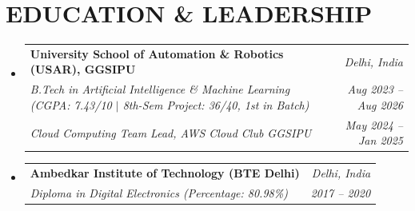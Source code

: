 \documentclass[10pt,a4paper]{article}
\makeatletter
\newcommand{\resumeSubheading}[4]{
  \vspace{-1pt}\item
    \begin{tabular*}{0.99\textwidth}[t]{@{}l@{\extracolsep{\fill}}r@{}}
      \textbf{#1} & \textit{\small #2} \\
      \textit{\small #3} & \textit{\small #4} \\
    \end{tabular*}\vspace{-5pt}
}
\newcommand{\resumeDualSubheading}[6]{
  \vspace{-1pt}\item
    \begin{tabular*}{0.99\textwidth}[t]{@{}l@{\extracolsep{\fill}}r@{}}
      \textbf{#1} & \textit{\small #2} \\
      \textit{\small #3} & \textit{\small #4} \\
      \textit{\small #5} & \textit{\small #6} \\
    \end{tabular*}\vspace{-5pt}
}
\makeatother
\begin{document}
\section{EDUCATION \& LEADERSHIP}
  \begin{itemize}[leftmargin=0.05in, label={}]
    \resumeDualSubheading
      {University School of Automation \& Robotics (USAR), GGSIPU}{Delhi, India}
      {B.Tech in Artificial Intelligence \& Machine Learning (CGPA: 7.43/10 $|$ 8th-Sem Project: 36/40, 1st in Batch)}{Aug 2023 -- Aug 2026}
      {Cloud Computing Team Lead, AWS Cloud Club GGSIPU}{May 2024 -- Jan 2025}
    \resumeSubheading
      {Ambedkar Institute of Technology (BTE Delhi)}{Delhi, India}
      {Diploma in Digital Electronics (Percentage: 80.98\%)}{2017 -- 2020}
  \end{itemize}
\end{document}
